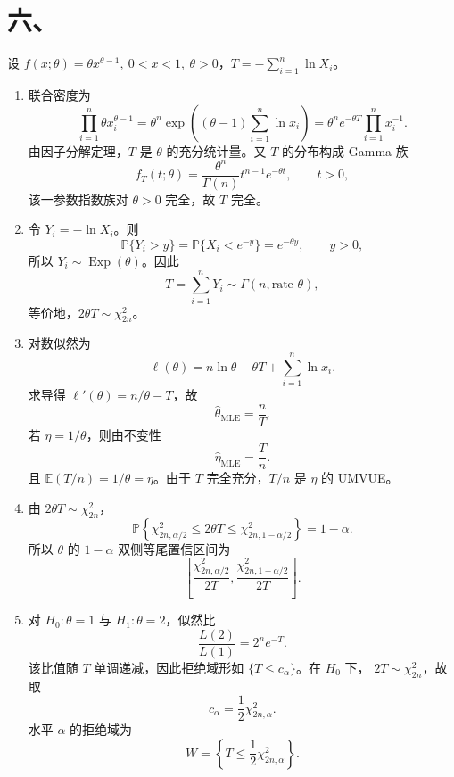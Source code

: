 \documentclass[UTF8,zihao=-4,fontset=windows]{ctexart}
\newcommand{\Prob}{\mathbb P}
\newcommand{\EX}{\mathbb E}
\begin{document}
\section*{六、}
设 $f(x;\theta)=\theta x^{\theta-1},\ 0<x<1,\ \theta>0$，$T=-\sum_{i=1}^n\ln X_i$。
\begin{enumerate}
  \item 联合密度为
  \[
    \prod_{i=1}^n\theta x_i^{\theta-1}
    =\theta^n\exp\left((\theta-1)\sum_{i=1}^n\ln x_i\right)
    =\theta^n e^{-\theta T}\prod_{i=1}^n x_i^{-1}.
  \]
  由因子分解定理，$T$ 是 $\theta$ 的充分统计量。又 $T$ 的分布构成 Gamma 族
  \[
    f_T(t;\theta)=\frac{\theta^n}{\Gamma(n)}t^{n-1}e^{-\theta t},\qquad t>0,
  \]
  该一参数指数族对 $\theta>0$ 完全，故 $T$ 完全。

  \item 令 $Y_i=-\ln X_i$。则
  \[
    \Prob\{Y_i>y\}=\Prob\{X_i<e^{-y}\}=e^{-\theta y},\qquad y>0,
  \]
  所以 $Y_i\sim \operatorname{Exp}(\theta)$。因此
  \[
    T=\sum_{i=1}^nY_i\sim \Gamma(n,\text{rate }\theta),
  \]
  等价地，$2\theta T\sim \chi^2_{2n}$。

  \item 对数似然为
  \[
    \ell(\theta)=n\ln\theta-\theta T+\sum_{i=1}^n\ln x_i.
  \]
  求导得 $\ell'(\theta)=n/\theta-T$，故
  \[
    \hat\theta_{\mathrm{MLE}}=\frac{n}{T}.
  \]
  若 $\eta=1/\theta$，则由不变性
  \[
    \hat\eta_{\mathrm{MLE}}=\frac{T}{n}.
  \]
  且 $\EX(T/n)=1/\theta=\eta$。由于 $T$ 完全充分，$T/n$ 是 $\eta$ 的 UMVUE。

  \item 由 $2\theta T\sim \chi^2_{2n}$，
  \[
    \Prob\left\{\chi^2_{2n,\alpha/2}\le 2\theta T\le
    \chi^2_{2n,1-\alpha/2}\right\}=1-\alpha.
  \]
  所以 $\theta$ 的 $1-\alpha$ 双侧等尾置信区间为
  \[
    \left[
      \frac{\chi^2_{2n,\alpha/2}}{2T},
      \frac{\chi^2_{2n,1-\alpha/2}}{2T}
    \right].
  \]

  \item 对 $H_0:\theta=1$ 与 $H_1:\theta=2$，似然比
  \[
    \frac{L(2)}{L(1)}=2^n e^{-T}.
  \]
  该比值随 $T$ 单调递减，因此拒绝域形如 $\{T\le c_\alpha\}$。在 $H_0$ 下，
  $2T\sim\chi^2_{2n}$，故取
  \[
    c_\alpha=\frac12\chi^2_{2n,\alpha}.
  \]
  水平 $\alpha$ 的拒绝域为
  \[
    W=\left\{T\le \frac12\chi^2_{2n,\alpha}\right\}.
  \]
\end{enumerate}
\end{document}
